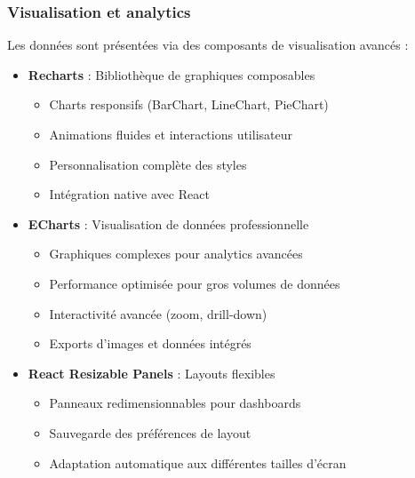 \documentclass[12pt,a4paper]{report}
\begin{document}
\subsubsection{Visualisation et analytics}
Les données sont présentées via des composants de visualisation avancés :

\begin{itemize}
\item \textbf{Recharts} : Bibliothèque de graphiques composables
  \begin{itemize}
  \item Charts responsifs (BarChart, LineChart, PieChart)
  \item Animations fluides et interactions utilisateur
  \item Personnalisation complète des styles
  \item Intégration native avec React
  \end{itemize}

\item \textbf{ECharts} : Visualisation de données professionnelle
  \begin{itemize}
  \item Graphiques complexes pour analytics avancées
  \item Performance optimisée pour gros volumes de données
  \item Interactivité avancée (zoom, drill-down)
  \item Exports d'images et données intégrés
  \end{itemize}

\item \textbf{React Resizable Panels} : Layouts flexibles
  \begin{itemize}
  \item Panneaux redimensionnables pour dashboards
  \item Sauvegarde des préférences de layout
  \item Adaptation automatique aux différentes tailles d'écran
  \end{itemize}
\end{itemize}
\end{document}
